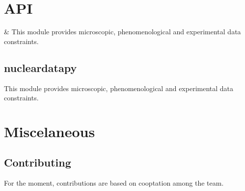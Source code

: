 \documentclass[letterpaper,10pt,english]{sphinxmanual}
\begin{document}
\sphinxstepscope


\section{API}
\label{\detokenize{source/api:api}}\label{\detokenize{source/api::doc}}

\begin{savenotes}\sphinxattablestart
\sphinxthistablewithglobalstyle
\sphinxthistablewithnovlinesstyle
\centering
\begin{tabulary}{\linewidth}[t]{}
\sphinxtoprule
\sphinxtableatstartofbodyhook
\sphinxAtStartPar
{\hyperref[\detokenize{source/generated/nucleardatapy:module-nucleardatapy}]{}}
&
\sphinxAtStartPar
This module provides microscopic, phenomenological and experimental data constraints.
\\
\sphinxbottomrule
\end{tabulary}
\sphinxtableafterendhook\par
\sphinxattableend\end{savenotes}

\sphinxstepscope


\subsection{nucleardatapy}
\label{\detokenize{source/generated/nucleardatapy:module-nucleardatapy}}\label{\detokenize{source/generated/nucleardatapy:nucleardatapy}}\label{\detokenize{source/generated/nucleardatapy::doc}}
\sphinxAtStartPar
This module provides microscopic, phenomenological and experimental data constraints.

\sphinxstepscope


\section{Miscelaneous}
\label{\detokenize{source/miscelaneous:miscelaneous}}\label{\detokenize{source/miscelaneous::doc}}

\subsection{Contributing}
\label{\detokenize{source/miscelaneous:contributing}}\label{\detokenize{source/miscelaneous:id1}}
\sphinxAtStartPar
For the moment, contributions are based on co\sphinxhyphen{}optation among the team.
\end{document}
